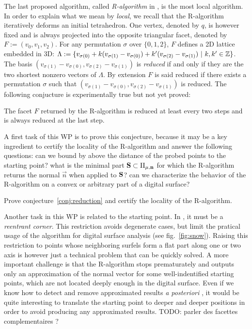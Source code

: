 The last proposed algorithm, called \emph{R-algorithm} in \cite{LPRJMIV2017}, is the most
local algorithm. In order to explain what we mean by \emph{local}, we recall that
the R-algorithm iteratively deforms an initial tetrahedron. One vertex, denoted by $q$,
is however fixed and is always projected into the opposite triangular facet, denoted by
$F := (v_0,v_1,v_2)$. For any permutation $\sigma$ over $\{0,1,2\}$, $F$ defines a 2D
lattice embedded in 3D:
$\Lambda := \{ v_{\sigma(0)} + k (v_{\sigma(1)}-v_{\sigma(0)}) + k' (v_{\sigma(2)}-v_{\sigma(1)}) \ | \ k,k' \in {\ensuremath\mathbb{Z}} \}$. 
The basis $(v_{\sigma(1)}-v_{\sigma(0)}, v_{\sigma(2)}-v_{\sigma(1)})$ is \emph{reduced} if and only
if they are the two shortest nonzero vectors of $\Lambda$. By extension $F$ is said reduced
if there exists a permutation $\sigma$ such that $(v_{\sigma(1)}-v_{\sigma(0)}, v_{\sigma(2)}-v_{\sigma(1)})$
is reduced. The following conjucture is experimentally true but not yet proved:

\begin{Conjecture}
  \label{conj:reduction}
  The facet $F$ returned by the R-algorithm is reduced at least every two steps and
  is always reduced at the last step.  
\end{Conjecture}

A first task of this WP is to prove this conjecture, because it may be
a key ingredient to certify the locality of the R-algorithm and answer
the following questions: can we bound by above the distance of the probed
points to the starting point? 
what is the minimal part $\mathbf{S} \subset \Pi_{\mu,\mathbf{n}}$ for which the
R-algorithm returns the normal $\vec{n}$ when applied to $\mathbf{S}$?
can we characterize the behavior of the R-algorithm on a convex or arbitrary
part of a digital surface?

\begin{Task}
  \label{task:reduction}
  Prove conjecture~\ref{conj:reduction} and certify the locality of the R-algorithm. 
\end{Task}

Another task in this WP is related to the starting point. In \cite{LPRJMIV2017},
it must be a \emph{reentrant corner}. This restriction avoids degenerate cases, but
limit the pratical usage of the algorithm for digital surface analysis
(see fig.~\ref{fig:snow}). Raising this restriction to points whose neighboring
surfels form a flat part along one or two axis is however just a technical
problem that can be quickly solved. A more important challenge is that the R-algorithm
stops prematurately and outputs only an approximation of the normal vector for some
well-indentified starting points, which are not located deeply enough in the digital
surface. Even if we know how to detect and remove approximated results
\emph{a posteriori} \cite{LPRJMIV2017}, it would be quite interesting to translate
the starting point to deeper and deeper positions in order to avoid producing any
approximated results.
TODO: parler des facettes complementaires ?

